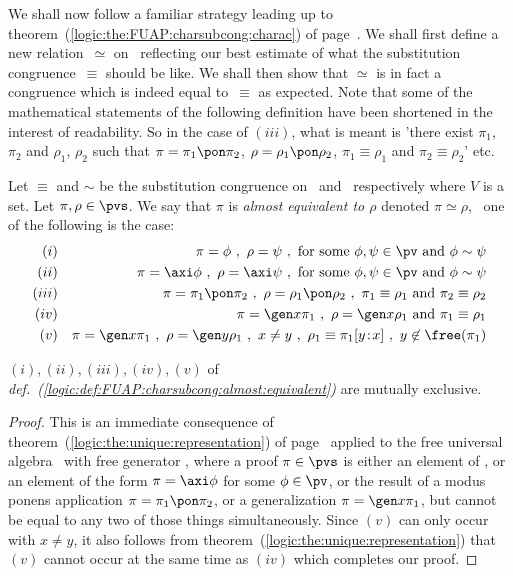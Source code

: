 We shall now follow a familiar strategy leading up to
theorem~(\ref{logic:the:FUAP:charsubcong:charac}) of
page~\pageref{logic:the:FUAP:charsubcong:charac}. We shall first
define a new relation~$\simeq$ on \pvs\ reflecting our best estimate
of what the substitution congruence~$\equiv$ should be like. We
shall then show that $\simeq$ is in fact a congruence which is
indeed equal to~$\equiv$ as expected. Note that some of the
mathematical statements of the following definition have been
shortened in the interest of readability. So in the case of $(iii)$,
what is meant is 'there exist $\pi_{1}$, $\pi_{2}$ and $\rho_{1}$,
$\rho_{2}$ such that $\pi=\pi_{1}\pon\pi_{2}$,
$\rho=\rho_{1}\pon\rho_{2}$, $\pi_{1}\equiv\rho_{1}$ and
$\pi_{2}\equiv\rho_{2}$' etc.


\begin{defin}\label{logic:def:FUAP:charsubcong:almost:equivalent}
Let $\equiv$ and $\sim$ be the substitution congruence on \pvs\ and
\pv\ respectively where $V$ is a set. Let $\pi,\rho\in\pvs$. We say
that $\pi$ is {\em almost equivalent to $\rho$} denoted
$\pi\simeq\rho$, \ifand\ one of the following is the case:
    \begin{eqnarray*}
    (i)&&\pi=\phi\ ,\ \rho=\psi\ ,\ \mbox{for some}\ \phi,\psi\in\pv\ \mbox{and}\ \phi\sim\psi\\
    (ii)&&\pi=\axi\phi\ ,\ \rho=\axi\psi\ ,\ \mbox{for some}\ \phi,\psi\in\pv\ \mbox{and}\ \phi\sim\psi\\
    (iii)&&\pi=\pi_{1}\pon\pi_{2}\ ,\ \rho=\rho_{1}\pon\rho_{2}\ ,\
    \pi_{1}\equiv\rho_{1}\ \mbox{and}\ \pi_{2}\equiv\rho_{2}\\
    (iv)&&\pi=\gen x\pi_{1}\ ,\ \rho=\gen x\rho_{1}\ \mbox{and}\ \pi_{1}\equiv\rho_{1}\\
    (v)&&\pi=\gen x\pi_{1}\ ,\ \rho=\gen y\rho_{1}\ ,\ x\neq y\ ,\
    \rho_{1}\equiv \pi_{1}[y\!:\!x]\ ,\ y\not\in\free(\pi_{1})
    \end{eqnarray*}
\end{defin}

\begin{prop}
$(i),(ii),(iii),(iv), (v)$ of {\em
def.~(\ref{logic:def:FUAP:charsubcong:almost:equivalent})} are
mutually exclusive.
\end{prop}
\begin{proof}
This is an immediate consequence of
theorem~(\ref{logic:the:unique:representation}) of
page~\pageref{logic:the:unique:representation} applied to the free
universal algebra \pvs\ with free generator \pv, where a proof
$\pi\in\pvs$ is either an element of \pv, or an element of the form
$\pi=\axi\phi$ for some $\phi\in\pv$, or the result of a modus
ponens application $\pi=\pi_{1}\pon\pi_{2}$, or a generalization
$\pi=\gen x\pi_{1}$, but cannot be equal to any two of those things
simultaneously. Since $(v)$ can only occur with $x\neq y$, it also
follows from theorem~(\ref{logic:the:unique:representation}) that
$(v)$ cannot occur at the same time as $(iv)$ which completes our
proof.
\end{proof}

